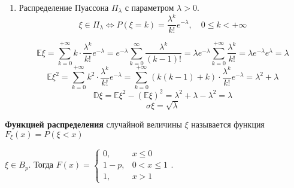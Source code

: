 \begin{enumerate}
    \item Распределение Пуассона \(\Pi_\lambda\) с параметром \(\lambda > 0\).
          \[\xi \in \Pi_\lambda \Leftrightarrow P(\xi = k) = \frac{\lambda^k}{k!} e^{ - \lambda}, \quad 0 \leq k < +\infty \]

          \[\mathbb{E}\xi = \sum_{k = 0}^{+\infty} k \cdot \frac{\lambda^k}{k!} e^{ - \lambda} = e^{ - \lambda} \sum_{k = 0}^{\infty} \frac{\lambda^k}{(k - 1)!} = \lambda e^{ - \lambda} \sum_{k = 0}^{+\infty} \frac{\lambda^k}{k!} = \lambda e^{ - \lambda} e^{ \lambda} = \lambda \]
          \[\mathbb{E}\xi^2 = \sum_{k = 0}^{+\infty} k^2 \cdot \frac{\lambda^k}{k!} e^{ - \lambda} = \sum_{k = 0}^{+\infty} (k(k - 1) + k) \cdot \frac{\lambda^k}{k!} e^{ - \lambda} = \lambda^2 + \lambda \]
          \[\mathbb{D}\xi = \mathbb{E}\xi^2 - (\mathbb{E}\xi)^2 = \lambda^2 + \lambda - \lambda^2 = \lambda\]
          \[\sigma \xi = \sqrt{\lambda}\]
\end{enumerate}

\begin{definition}
    \textbf{Функцией распределения} случайной величины \(\xi\) называется функция \(F_\xi(x) = P(\xi < x)\)
\end{definition}

\begin{example}
    \(\xi \in B_p\). Тогда \(F(x) = \begin{cases} 0, & x \leq 0 \\ 1 - p, & 0 < x \leq 1 \\ 1 , & x > 1 \end{cases}\).
\end{example}

